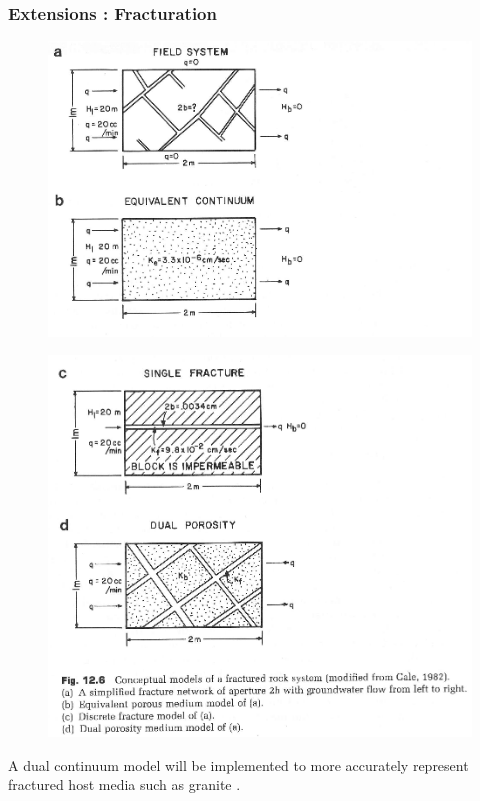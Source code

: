 

\begin{frame}[ctb!]
  \frametitle{Extensions : Fracturation}
    \begin{minipage}{0.49\textwidth}
      \begin{figure}[h!]
        \includegraphics[width=\textwidth]{./images/fracturesAB.eps}
        \label{fig:fracturesAB}
      \end{figure}
    \end{minipage}
    \hspace{.01cm}
    \begin{minipage}{0.49\textwidth}
      \begin{figure}[h!]
        \includegraphics[width=\textwidth]{./images/fracturesCD.eps}
        \label{fig:fracturesCD}
      \end{figure}
    \end{minipage}

  A dual continuum model will be implemented to more accurately represent 
  fractured host media such as granite \cite{anderson_applied_1992}.
\end{frame}


